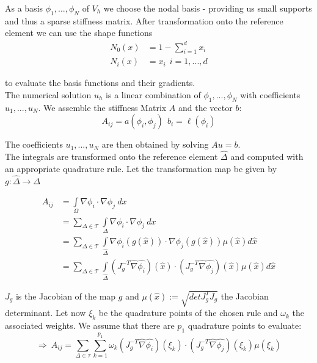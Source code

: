 \documentclass[11pt,a4paper,headinclude,footinclude,DIV16,normalheadings]{scrreprt}
\begin{document}
As a basis $\phi_1 ,...,\phi_N$ of $V_h$ we choose the nodal basis - providing us small supports and thus a sparse stiffness matrix. After transformation onto the reference element we can use the shape functions
\begin{align}
N_0(x) & = 1 - \sum\limits_{i=1}^d x_i \\
N_i(x) & = x_i \ \ i=1,...,d
\end{align}

to evaluate the basis functions and their gradients. \\

The numerical solution $u_h$ is a linear combination of $\phi_1,...,\phi_N$ with coefficients $u_1,...,u_N$. We assemble the stiffness Matrix $A$ and the vector $b$:
\begin{equation}
 A_{ij}=a(\phi_i ,\phi_j ) \ \ b_i=\ell (\phi_i )
\end{equation}

The coefficients $u_1,...,u_N$ are then obtained by solving $Au=b$. \\

The integrals are transformed onto the reference element $\hat{\Delta}$ and computed with an appropriate quadrature rule. Let the transformation map be given by $g: \hat{\Delta} \to \Delta$

\begin{align}
 A_{ij} & = \int\limits_{\Omega}\nabla\phi_i\cdot\nabla\phi_j\ dx\\
& = \sum\limits_{\Delta\in\mathcal{T}} \int\limits_{\Delta}\nabla\phi_i\cdot\nabla\phi_j\ dx\\
& = \sum\limits_{\Delta\in\mathcal{T}} \int\limits_{\hat{\Delta}}\nabla\phi_i (g(\hat{x}))
	\cdot\nabla\phi_j (g(\hat{x}))\mu (\hat{x} )d\hat{x}\\
& = \sum\limits_{\Delta\in\mathcal{T}} \int\limits_{\hat{\Delta}} (J_g^{-T}\hat{\nabla}\hat{\phi_i} )(\hat{x} )
	\cdot (J_g^{-T}\hat{\nabla}\hat{\phi_j} )(\hat{x} )\mu (\hat{x} )d\hat{x}
\end{align}

$J_g$ is the Jacobian of the map $g$ and $\mu (\hat{x}):=\sqrt{det J_g^{T} J_g}$ the Jacobian determinant. Let now $\xi_k$ be the quadrature points  of the chosen rule and $\omega_k$ the associated weights. We assume that there are $p_1$ quadrature points to evaluate:
\begin{equation}
\label{equ:computea}
 \Rightarrow \ A_{ij} = \sum\limits_{\Delta\in\tau} \sum\limits_{k=1}^{p_1} 
\omega_k(J_g^{-T}\hat{\nabla}\hat{\phi_i} )(\xi_k )
\cdot (J_g^{-T}\hat{\nabla}\hat{\phi_j} )(\xi_k )\mu (\xi_k )
\end{equation}
\end{document}
